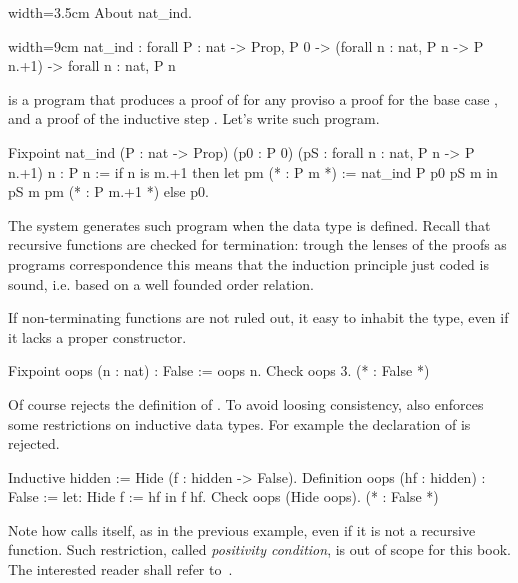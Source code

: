 \begin{coq}{}{width=3.5cm}
About nat_ind.
\end{coq}
\begin{coqout}{}{width=9cm}
nat_ind : forall P : nat -> Prop,
  P 0 -> (forall n : nat, P n -> P n.+1) -> forall n : nat, P n
\end{coqout}
 is a program that produces a proof of  for any 
proviso a proof for the base case , and a proof
of the inductive step .
Let's write such program.

\begin{coq}{}{}
Fixpoint nat_ind (P : nat -> Prop)
  (p0 : P 0) (pS : forall n : nat, P n -> P n.+1) n : P n :=
  if n is m.+1 then
    let pm (* : P m *) := nat_ind P p0 pS m in
    pS m pm (* : P m.+1 *)
  else p0.
\end{coq}

The \Coq{} system generates such program when the  data type
is defined.  Recall that recursive functions are checked for termination:
trough the lenses of the proofs as programs correspondence this means
that the induction principle just coded is sound, i.e. based on a well
founded order relation.

If non-terminating functions are not ruled out, it easy to inhabit
the  type, even if it lacks a proper constructor.

\begin{coq}{}{}
Fixpoint oops (n : nat) : False := oops n.
Check oops 3.  (* : False *)
\end{coq}
Of course \Coq{} rejects the definition of .  To avoid
loosing consistency, \Coq{} also enforces some restrictions on
inductive data types.  For example the declaration of 
is rejected.

\begin{coq}{}{}
Inductive hidden := Hide (f : hidden -> False).
Definition oops (hf : hidden) : False := let: Hide f := hf in f hf.
Check oops (Hide oops).  (* : False *)
\end{coq}
Note how  calls itself, as in the previous example,
even if it is not a recursive function.
Such restriction, called
\emph{positivity condition}, is out of scope for this book.  
The interested reader shall
refer to~\cite{Coq:manual}.

\label{sec:strongind}

